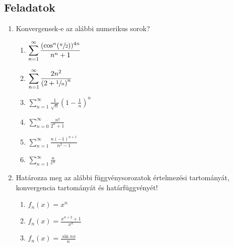\documentclass[a4paper, 12pt]{scrartcl}
\begin{document}
\subsection{Feladatok}
\begin{enumerate}
  \item Konvergensek-e az alábbi numerikus sorok?
        \begin{multicols}{2}
          \begin{enumerate}
            \item $\displaystyle
                    \sum_{n= 1}^{\infty} \frac{(\cos^n (\sfrac{\pi}{2}) )^{4n}}{n^n + 1}
                  $

            \item $\displaystyle
                    \sum_{n = 1}^{\infty} \frac{2n^2}{\left(2 + \sfrac{1}{n}\right)^n}
                  $

            \item $\displaystyle
                    \sum_{n = 1}^{\infty} \frac{1}{\sqrt{n}}\left(1-\frac{1}{n}\right)^n
                  $

            \item $\displaystyle
                    \sum_{n= 0}^{\infty} \frac{n!}{2^n + 1}
                  $

            \item $\displaystyle
                    \sum_{n=1}^{\infty} \frac{n (-1)^{n+1} }{n^2-1}
                  $

            \item $\displaystyle
                    \sum_{n=1}^{\infty} \frac{n}{e^n}
                  $
          \end{enumerate}
        \end{multicols}

  \item Határozza meg az alábbi függvénysorozatok értelmezési tartományát,
        konvergencia tartományát és határfüggvényét!
        \begin{multicols}{2}
          \begin{enumerate}
            \item $
                    f_n(x) = x^n
                  $

            \item $\displaystyle
                    f_n(x) = \frac{x^{n+2}+1}{x^n}
                  $

            \item $\displaystyle
                    f_n(x) = \frac{\sin nx}{n}
                  $


\end{enumerate}
\end{multicols}
\end{enumerate}
\end{document}
